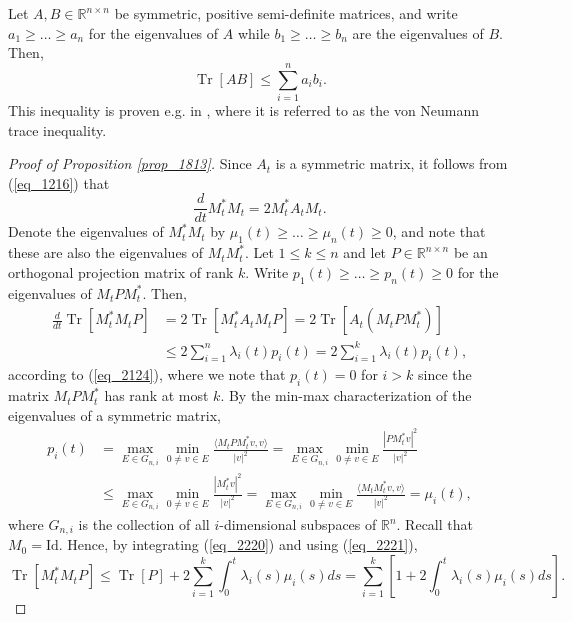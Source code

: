 \documentclass[12pt,a4paper]{article}
\newcommand{\Tr}{\mathop{\mathrm{Tr}}\nolimits}
\newcommand{\tr}{\mathop{\mathrm{Tr}}\nolimits}
\newcommand{\RR}{\mathbb{R}}
\newcommand{\id}{\mathrm{Id}}
\theoremstyle{definition}
\begin{document}
Let $A, B \in \RR^{n \times n}$ be symmetric, positive semi-definite matrices,
and write $a_1 \geq \ldots \geq a_n$ for the eigenvalues of $A$ while $b_1 \geq \ldots \geq b_n$ are the eigenvalues of $B$.
Then,
\begin{equation}  \Tr[A B] \leq \sum_{i=1}^n a_i b_i.
\label{eq_2124} \end{equation}
This inequality is proven e.g. in \cite[Theorem 8.7.6]{HJ}, where it is referred to as the von Neumann trace inequality.

\begin{proof}[Proof of Proposition \ref{prop_1813}]
Since $A_t$ is a symmetric matrix, it follows from (\ref{eq_1216}) that
$$ \frac{d}{dt} M_t^* M_t = 2 M_t^* A_t M_t. $$
Denote the eigenvalues of $M_t^* M_t$ by $\mu_1(t) \geq \ldots \geq \mu_n(t) \geq 0$,
and note that these are also the eigenvalues of $M_t M_t^*$.
Let $1 \leq k \leq n$ and let $P \in \RR^{n \times n}$ be an orthogonal projection matrix  of rank $k$.
Write $p_1(t) \geq \ldots \geq p_n(t) \geq 0$ for the eigenvalues of $M_t P M_t^*$.
Then,
\begin{align}  \nonumber \frac{d}{dt} \tr[ M_t^* M_t P] & = 2 \tr[ M_t^* A_t M_t P] = 2 \tr[ A_t (M_t P M_t^*) ] \\ & \leq 2 \sum_{i=1}^n \lambda_i(t) p_i(t)
= 2 \sum_{i=1}^k \lambda_i(t) p_i(t), \label{eq_2220} \end{align}
according to (\ref{eq_2124}), where we note that $p_i(t) = 0$ for $i > k$ since the matrix $M_t P M_t^*$ has rank at most $k$.
By the min-max characterization of the eigenvalues of a symmetric matrix,
\begin{equation}\label{eq_2221}
\begin{split}  p_i(t) & = \max_{E \in G_{n,i}} \min_{0 \neq v \in E} \frac{\langle M_t P M_t^* v, v \rangle}{|v|^2}
= \max_{E \in G_{n,i}} \min_{0 \neq v \in E} \frac{|P M_t^* v|^2}{|v|^2}
\\ & \leq \max_{E \in G_{n,i}} \min_{0 \neq v \in E} \frac{|M_t^* v|^2}{|v|^2} = \max_{E \in G_{n,i}} \min_{0 \neq v \in E} \frac{\langle M_t M_t^* v, v \rangle}{|v|^2} = \mu_i(t),
\end{split}
\end{equation}
where $G_{n,i}$ is the collection of all $i$-dimensional subspaces of $\RR^n$.
Recall that $M_0 = \id$. Hence, by integrating  (\ref{eq_2220}) and using (\ref{eq_2221}),
\begin{equation}
\tr[ M_t^* M_t P ] \leq \tr[P] + 2 \sum_{i=1}^k \int_0^t \lambda_i(s) \mu_i(s) ds
= \sum_{i=1}^k \left[ 1 + 2 \int_0^t \lambda_i(s) \mu_i(s) ds \right].

\end{equation}
\end{proof}
\end{document}

